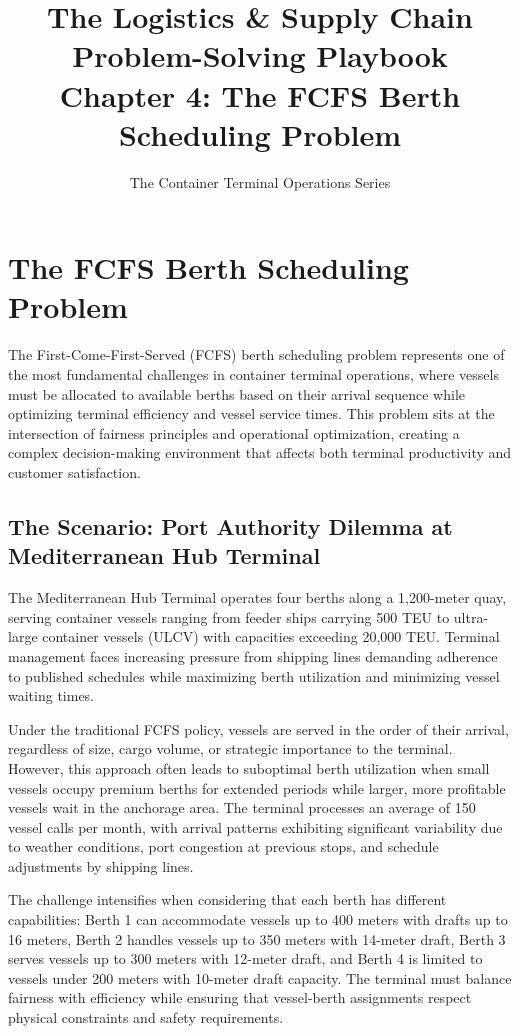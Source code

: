 \documentclass{article}
\title{The Logistics \& Supply Chain Problem-Solving Playbook\\Chapter 4: The FCFS Berth Scheduling Problem}
\author{The Container Terminal Operations Series}
\date{}
\begin{document}
\maketitle

\section{The FCFS Berth Scheduling Problem}

The First-Come-First-Served (FCFS) berth scheduling problem represents one of the most fundamental challenges in container terminal operations, where vessels must be allocated to available berths based on their arrival sequence while optimizing terminal efficiency and vessel service times. This problem sits at the intersection of fairness principles and operational optimization, creating a complex decision-making environment that affects both terminal productivity and customer satisfaction.

\subsection{The Scenario: Port Authority Dilemma at Mediterranean Hub Terminal}

The Mediterranean Hub Terminal operates four berths along a 1,200-meter quay, serving container vessels ranging from feeder ships carrying 500 TEU to ultra-large container vessels (ULCV) with capacities exceeding 20,000 TEU. Terminal management faces increasing pressure from shipping lines demanding adherence to published schedules while maximizing berth utilization and minimizing vessel waiting times.

Under the traditional FCFS policy, vessels are served in the order of their arrival, regardless of size, cargo volume, or strategic importance to the terminal. However, this approach often leads to suboptimal berth utilization when small vessels occupy premium berths for extended periods while larger, more profitable vessels wait in the anchorage area. The terminal processes an average of 150 vessel calls per month, with arrival patterns exhibiting significant variability due to weather conditions, port congestion at previous stops, and schedule adjustments by shipping lines.

The challenge intensifies when considering that each berth has different capabilities: Berth 1 can accommodate vessels up to 400 meters with drafts up to 16 meters, Berth 2 handles vessels up to 350 meters with 14-meter draft, Berth 3 serves vessels up to 300 meters with 12-meter draft, and Berth 4 is limited to vessels under 200 meters with 10-meter draft capacity. The terminal must balance fairness with efficiency while ensuring that vessel-berth assignments respect physical constraints and safety requirements.
\end{document}
